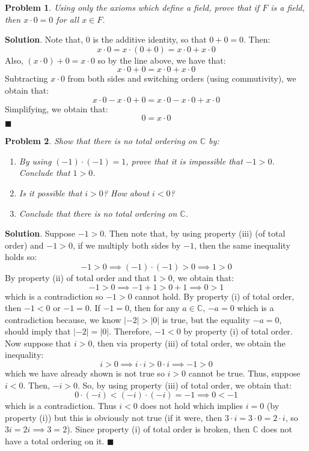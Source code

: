 \documentclass[12pt]{article}
\newcommand{\abs}[1]{\left| #1 \right|} %
\renewcommand{\=}[1]{\stackrel{#1}{=}} %
\newtheorem{p}{Problem}[section]
\theoremstyle{definition}
\newenvironment{s}{%
        \begin{trivlist} \item \textbf{Solution}. }{%
            \hspace*{\fill} $\blacksquare$\end{trivlist}}%
\begin{document}
\begin{p}
    Using only the axioms which define a field, prove that if $F$ is a field, then
    $x\cdot 0 = 0$ for all $x\in F$.
\end{p}
\begin{s}
    Note that, $0$ is the additive identity, so that $0 + 0 = 0$. Then:
    \[ x \cdot 0 = x \cdot (0 + 0) = x\cdot 0 + x\cdot 0 \]
    Also, $(x\cdot 0) + 0 = x\cdot 0$ so by the line above, we have that:
    \[x\cdot 0 + 0 = x\cdot 0 + x\cdot 0\]
    Subtracting $x\cdot 0$ from both sides and switching orders (using commutivity),
    we obtain that:
    \[x\cdot 0 - x\cdot 0 + 0 = x\cdot 0 - x\cdot 0 + x\cdot 0\]
    Simplifying, we obtain that:
    \[0 = x\cdot 0\]
\end{s}

\begin{p}
    Show that there is no total ordering on $\mathbb{C}$ by:
    \begin{enumerate}
        \item By using $(-1)\cdot(-1)=1$, prove that it is impossible that $-1 > 0$.
            Conclude that $1 > 0$.
        \item Is it possible that $i > 0$? How about $i < 0$?
        \item Conclude that there is no total ordering on $\mathbb{C}$.
    \end{enumerate}
\end{p}
\begin{s}
    Suppose $-1 > 0$. Then note that, by using property (iii) (of total order) and $-1 > 0$, if we multiply
    both sides by $-1$, then the same inequality holds so:
    \[-1 > 0 \implies (-1) \cdot (-1) > 0 \implies 1 > 0\]
    By property (ii) of total order and that $1 > 0$, we obtain that:
    \[ -1 > 0 \implies -1 + 1 > 0 + 1 \implies 0 > 1\] which is a contradiction so $-1 > 0$ cannot hold. By
    property (i) of total order, then $-1 < 0$ or $-1 = 0$. If $-1 = 0$, then for any $a\in\mathbb{C}$, 
    $-a = 0$ which is a contradiction because, we know $\abs{-2} > \abs{0}$ is true, but the equality $-a = 0$, should imply
    that $\abs{-2} = \abs{0}$. Therefore, $-1 < 0$ by property (i) of total order. 
    Now suppose that $i > 0$, then via property (iii) of total order, we obtain the inequality:
    \[i > 0 \implies i \cdot i > 0 \cdot i \implies -1 > 0\]
    which we have already shown is not true so $i > 0$ cannot be true. Thus, suppose $i < 0$. Then, $-i > 0$.
    So, by using property (iii) of total order, we obtain that:
    \[ 0 \cdot (-i) < (-i) \cdot (-i) = -1 \implies 0 < -1 \]
    which is a contradiction. Thus $i < 0$ does not hold which implies $i = 0$ (by property (i)) but this is
    obviously not true (if it were, then $3 \cdot i = 3 \cdot 0 = 2 \cdot i$, so $3i = 2i \implies 3 = 2$). Since property (i) of total order is broken, then
    $\mathbb{C}$ does not have a total ordering on it.
\end{s}
\end{document}
